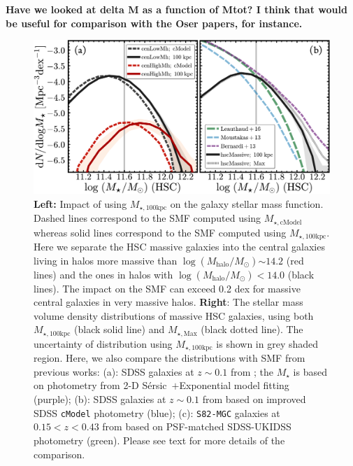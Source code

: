 \documentclass[a4paper,fleqn,usenatbib]{mnras}
\def\ser{{S\'{e}rsic\ }}
\def\mstar{{$M_{\star}$}}
\def\logmh{{$\log (M_{\mathrm{halo}}/M_{\odot})$}}
\def\mtot{{$M_{\star,100\mathrm{kpc}}$}}
\def\mmax{{$M_{\star,\mathrm{Max}}$}}
\def\mcmodel{{$M_{\star,\mathrm{cModel}}$}}
\begin{document}
    {\bf Have we looked at delta M as a function of Mtot?  I think that would be useful 
    for comparison with the Oser papers, for instance. }


  \begin{figure}
      \centering 
      \includegraphics[width=\textwidth]{fig/redbcg_mass_smf}
      \caption{
          \textbf{Left:} Impact of using \mtot{} on the galaxy stellar mass function. 
          Dashed lines correspond to the SMF computed using \mcmodel{} whereas solid 
          lines correspond to the SMF computed using \mtot{}. 
          Here we separate the HSC massive galaxies into the central galaxies living 
          in halos more massive than \logmh{}$\sim14.2$ (red lines) and the ones in 
          halos with \logmh{}$<14.0$ (black lines).
          The impact on the SMF can exceed 0.2 dex for massive central galaxies in 
          very massive halos.
          \textbf{Right}: The stellar mass volume density distributions of massive 
          HSC galaxies, using both \mtot{} (black solid line) and \mmax{} (black dotted 
          line). 
          The uncertainty of distribution using \mtot{} is shown in grey shaded 
          region.  
          Here, we also compare the distributions with SMF from previous works: 
          (a): SDSS galaxies at $z{\sim} 0.1$ from \citet{Bernardi2013}; the \mstar{} 
          is based on photometry from 2-D \ser{}$+$Exponential model fitting 
          (purple); 
          (b): SDSS galaxies at $z{\sim} 0.1$ from \citet{Moustakas13} based on 
          improved SDSS \texttt{cModel} photometry (blue); 
          (c): \texttt{S82-MGC} galaxies at $0.15 < z< 0.43$ from 
          \citet{Leauthaud2016} based on PSF-matched SDSS-UKIDSS photometry (green).
          Please see text for more details of the comparison.
          }
      \label{fig:discussion_2}
  \end{figure}
\end{document}
